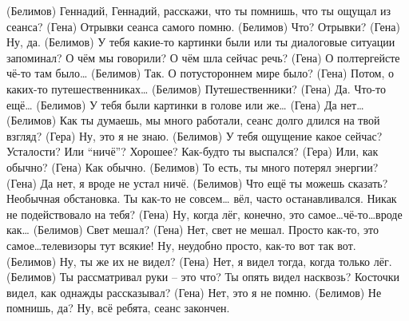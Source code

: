   (Белимов) Геннадий, Геннадий, расскажи, что ты помнишь, что ты ощущал из сеанса?
  (Гена) Отрывки сеанса самого помню.
  (Белимов) Что? Отрывки?
  (Гена) Ну, да.
  (Белимов) У тебя какие-то картинки были или ты диалоговые ситуации запоминал? О чём мы говорили? О чём шла сейчас речь?
  (Гена) О полтергейсте чё-то там было…
  (Белимов) Так. О потустороннем мире было?
  (Гена) Потом, о каких-то путешественниках…
  (Белимов) Путешественники? 
  (Гена) Да. Что-то ещё…
  (Белимов)  У тебя были картинки в голове или же…
  (Гена) Да нет…
  (Белимов) Как ты думаешь, мы много работали, сеанс долго длился на твой взгляд?
  (Гера) Ну, это я не знаю.  
  (Белимов) У тебя ощущение какое сейчас? Усталости? Или ``ничё''? Хорошее? Как-будто ты выспался? 
  (Гера) Или, как обычно?
  (Гена) Как обычно.
  (Белимов) То есть, ты много потерял энергии?
  (Гена) Да нет, я вроде не устал ничё.
  (Белимов) Что ещё ты можешь сказать? Необычная обстановка. Ты как-то не совсем… вёл, часто останавливался. Никак не подействовало на тебя?
  (Гена) Ну, когда лёг, конечно, это самое…чё-то…вроде как…
  (Белимов)  Свет мешал?
  (Гена) Нет, свет не мешал. Просто как-то, это самое…телевизоры тут всякие! Ну, неудобно просто, как-то вот так вот.
  (Белимов) Ну, ты же их не видел?
  (Гена) Нет, я видел тогда, когда только лёг. 
  (Белимов) Ты рассматривал руки – это что? Ты опять видел насквозь? Косточки видел, как однажды рассказывал?
  (Гена) Нет, это я не помню. 
  (Белимов) Не помнишь, да? Ну, всё ребята, сеанс закончен.